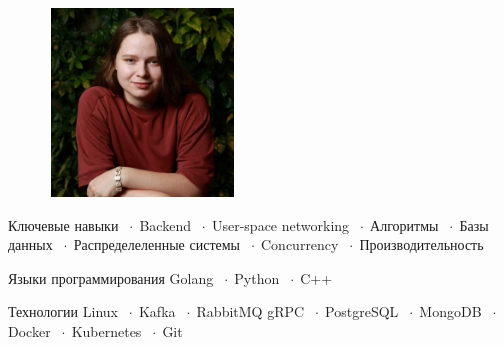 \documentclass[12pt]{cutecv}
\author{Ксения Сырбулова}
\newcommand{\listbullet}{$\; \cdot \;$}
\begin{document}
\maketitle

\begin{paracol}{2}
\setlength{\columnsep}{2em}
\setlength{\cvsectionverticalskip}{5mm}
\setlength{\cvinfoverticalskip}{5mm}

\begin{leftcolumn}
  \vspace{5mm}
  \begin{figure}[htp]
    \includegraphics[width=5cm, height=5cm]{image.jpg}
\end{figure}

\begin{cvsection}{Ключевые навыки}
  \listbullet Backend \listbullet User-space networking \listbullet Алгоритмы \listbullet Базы данных
   \listbullet Распределеленные системы \listbullet Concurrency
   \listbullet Производительность \\
\end{cvsection}

\begin{cvsection}{Языки программирования}
  Golang \listbullet Python \listbullet C++
\end{cvsection}

\begin{cvsection}{Технологии}
  Linux \listbullet Kafka \listbullet RabbitMQ
  gRPC \listbullet PostgreSQL \listbullet  MongoDB \listbullet Docker \listbullet Kubernetes
  \listbullet Git \\
\end{cvsection}

\end{leftcolumn}


\end{paracol}
\end{document}
